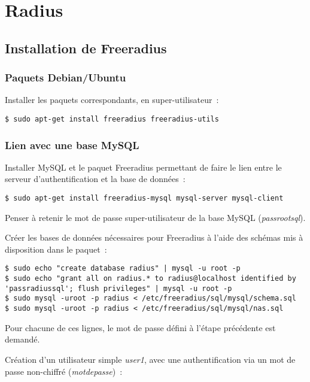 \section{Radius}
\subsection{Installation de Freeradius}
\subsubsection{Paquets Debian/Ubuntu}

Installer les paquets correspondants, en super-utilisateur~:

\begin{lstlisting}
$ sudo apt-get install freeradius freeradius-utils
\end{lstlisting}

\subsubsection{Lien avec une base MySQL}

Installer MySQL et le paquet Freeradius permettant de faire le lien entre le serveur d'authentification et la base de données~:

\begin{lstlisting}
$ sudo apt-get install freeradius-mysql mysql-server mysql-client
\end{lstlisting}

Penser à retenir le mot de passe super-utilisateur de la base MySQL (\emph{passrootsql}).

Créer les bases de données nécessaires pour Freeradius à l'aide des schémas mis à disposition dans le paquet~:

\begin{lstlisting}
$ sudo echo "create database radius" | mysql -u root -p
$ sudo echo "grant all on radius.* to radius@localhost identified by 'passradiussql'; flush privileges" | mysql -u root -p
$ sudo mysql -uroot -p radius < /etc/freeradius/sql/mysql/schema.sql
$ sudo mysql -uroot -p radius < /etc/freeradius/sql/mysql/nas.sql
\end{lstlisting}

Pour chacune de ces lignes, le mot de passe défini à l'étape précédente est demandé.

Création d'un utilisateur simple \emph{user1}, avec une authentification via un mot de passe non-chiffré (\emph{motdepasse})~:

